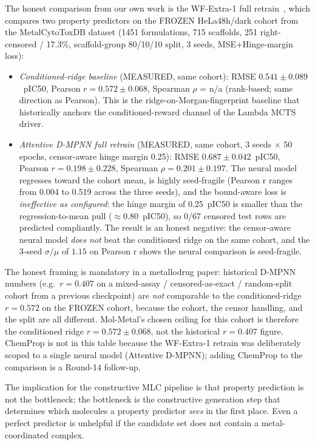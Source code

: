 The honest comparison from our own work is the WF-Extra-1 full
retrain~\cite{footnote:wf_extra1_full}, which compares two property
predictors on the FROZEN HeLa48h/dark cohort from the MetalCytoToxDB
dataset (1451 formulations, 715 scaffolds, 251 right-censored / 17.3\%,
scaffold-group 80/10/10 split, 3 seeds, MSE+Hinge-margin loss):

\begin{itemize}
  \item \emph{Conditioned-ridge baseline} (MEASURED, same cohort): RMSE
  $0.541 \pm 0.089$~pIC50, Pearson $r = 0.572 \pm 0.068$, Spearman
  $\rho$ = n/a (rank-based; same direction as Pearson). This is the
  ridge-on-Morgan-fingerprint baseline that historically anchors the
  conditioned-reward channel of the Lambda MCTS driver.
  \item \emph{Attentive D-MPNN full retrain} (MEASURED, same cohort,
  3 seeds $\times$ 50 epochs, censor-aware hinge margin 0.25):
  RMSE $0.687 \pm 0.042$~pIC50, Pearson $r = 0.198 \pm 0.228$,
  Spearman $\rho = 0.201 \pm 0.197$. The neural model regresses
  toward the cohort mean, is highly seed-fragile (Pearson r ranges
  from 0.004 to 0.519 across the three seeds), and the
  bound-aware loss is \emph{ineffective as configured}: the hinge
  margin of 0.25~pIC50 is smaller than the regression-to-mean pull
  ($\approx 0.80$~pIC50), so 0/67 censored test rows are predicted
  compliantly. The result is an honest negative: the censor-aware
  neural model \emph{does not} beat the conditioned ridge on the same
  cohort, and the 3-seed $\sigma/\mu$ of $1.15$ on Pearson r shows the
  neural comparison is seed-fragile.
\end{itemize}

The honest framing is mandatory in a metallodrug paper: historical
D-MPNN numbers (e.g.\ $r = 0.407$ on a mixed-assay / censored-as-exact
/ random-split cohort from a previous checkpoint) are \emph{not}
comparable to the conditioned-ridge $r = 0.572$ on the FROZEN cohort,
because the cohort, the censor handling, and the split are all
different. Mol-Metal's chosen ceiling for this cohort is therefore the
conditioned ridge $r = 0.572 \pm 0.068$, not the historical $r =
0.407$ figure. ChemProp is not in this table because the WF-Extra-1
retrain was deliberately scoped to a single neural model (Attentive
D-MPNN); adding ChemProp to the comparison is a Round-14 follow-up.

The implication for the constructive MLC pipeline is that property
prediction is not the bottleneck; the bottleneck is the constructive
generation step that determines which molecules a property predictor
\emph{sees} in the first place. Even a perfect predictor is unhelpful
if the candidate set does not contain a metal-coordinated complex.


